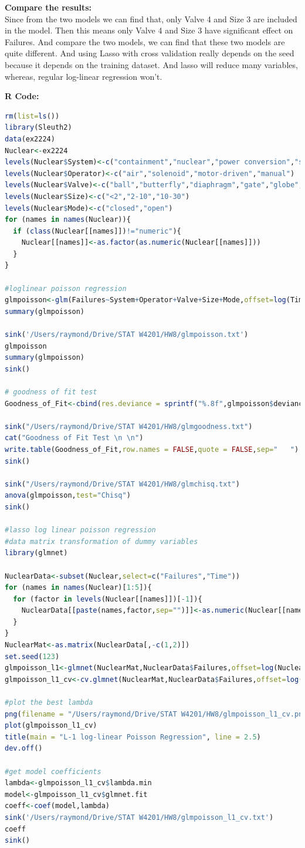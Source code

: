\documentclass[10pt,letterpaper]{article}
\begin{document}
\textbf{Compare the results:}\\

Since from the two models we can find that, only Valve 4 and Size 3 are included in the model. Then this means only Valve 4 and Size 3 have significant effect on Failures. And compare the two models, we can find that these two models are quite different. And using Lasso with cross validation really depends on the seed because it depends on the training dataset. And lasso will reduce many variables, whereas, regular log-linear regression won't.


\newpage
\textbf{R Code:}
\begin{lstlisting}[language=R]
rm(list=ls())
library(Sleuth2)
data(ex2224)
Nuclear<-ex2224
levels(Nuclear$System)<-c("containment","nuclear","power conversion","safety","process auxiliary")
levels(Nuclear$Operator)<-c("air","solenoid","motor-driven","manual")
levels(Nuclear$Valve)<-c("ball","butterfly","diaphragm","gate","globe","directional control")
levels(Nuclear$Size)<-c("<2","2-10","10-30")
levels(Nuclear$Mode)<-c("closed","open")
for (names in names(Nuclear)){
  if (class(Nuclear[[names]])!="numeric"){
    Nuclear[[names]]<-as.factor(as.numeric(Nuclear[[names]]))
  }
}

#loglinear poisson regression 
glmpoisson<-glm(Failures~System+Operator+Valve+Size+Mode,offset=log(Time),data=Nuclear,family="poisson")
summary(glmpoisson)

sink('/Users/raymond/Drive/STAT W4201/HW8/glmpoisson.txt')
glmpoisson
summary(glmpoisson)
sink()

# goodness of fit test
Goodness_of_Fit<-cbind(res.deviance = sprintf("%.8f",glmpoisson$deviance),df = glmpoisson$df.residual, p.value = sprintf("%.8f",(1-pchisq(glmpoisson$deviance,glmpoisson$df.residual))))

sink("/Users/raymond/Drive/STAT W4201/HW8/glmgoodness.txt")
cat("Goodness of Fit Test \n \n")
write.table(Goodness_of_Fit,row.names = FALSE,quote = FALSE,sep="   ")
sink()

sink("/Users/raymond/Drive/STAT W4201/HW8/glmchisq.txt")
anova(glmpoisson,test="Chisq")
sink()

#lasso log linear poisson regression
#data matrix transformation of dummy variables
library(glmnet)

NuclearData<-subset(Nuclear,select=c("Failures","Time"))
for (names in names(Nuclear)[1:5]){
  for (factor in levels(Nuclear[[names]])[-1]){
    NuclearData[[paste(names,factor,sep="")]]<-as.numeric(Nuclear[[names]]==factor)
  }
}
NuclearMat<-as.matrix(NuclearData[,-c(1,2)])
set.seed(123)
glmpoisson_l1<-glmnet(NuclearMat,NuclearData$Failures,offset=log(NuclearData$Time),family="poisson")
glmpoisson_l1_cv<-cv.glmnet(NuclearMat,NuclearData$Failures,offset=log(NuclearData$Time),family="poisson")

#plot the best lambda
png(filename = "/Users/raymond/Drive/STAT W4201/HW8/glmpoisson_l1_cv.png")
plot(glmpoisson_l1_cv)
title(main = "L-1 log-linear Poisson Regression", line = 2.5)
dev.off()

#get model coefficients
lambda<-glmpoisson_l1_cv$lambda.min
model<-glmpoisson_l1_cv$glmnet.fit
coeff<-coef(model,lambda)
sink('/Users/raymond/Drive/STAT W4201/HW8/glmpoisson_l1_cv.txt')
coeff
sink()
\end{lstlisting}
\end{document}
